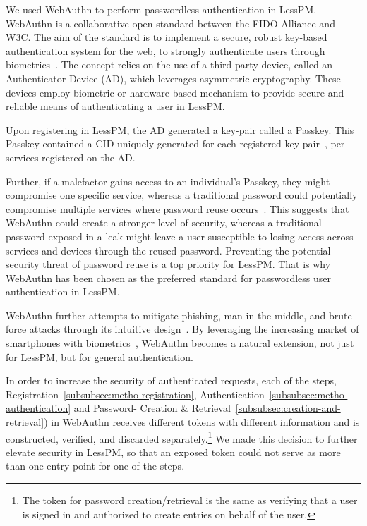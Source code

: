 We used WebAuthn to perform passwordless authentication in LessPM\@.
WebAuthn is a collaborative open standard between the FIDO Alliance and W3C\@.
The aim of the standard is to implement a secure, robust key-based
authentication system for the web, to strongly authenticate users through
biometrics~\cite{webauthn_level_2}.
The concept relies on the use of a third-party device, called an
Authenticator Device (AD), which leverages asymmetric cryptography.
These devices employ biometric or hardware-based mechanism to provide secure
and reliable means of authenticating a user in LessPM\@.

Upon registering in LessPM, the AD generated a key-pair called a Passkey.
This Passkey contained a CID uniquely generated for each registered
key-pair~\cite{webauthn_credential_id,webauthn_public_key_credential}, per
services registered on the AD\@.

Further, if a malefactor gains access to an individual's Passkey, they might
compromise one specific service, whereas a traditional password could
potentially compromise multiple services where password reuse
occurs~\cite{wang2018next}.
This suggests that WebAuthn could create a stronger level of security, whereas
a traditional password exposed in a leak might leave a user susceptible to
losing access across services and devices through the reused password.
Preventing the potential security threat of password reuse is a top priority
for LessPM\@.
That is why WebAuthn has been chosen as the preferred standard for
passwordless user authentication in LessPM\@.

WebAuthn further attempts to mitigate phishing, man-in-the-middle, and
brute-force attacks through its intuitive design~\cite{webauthn_level_2}.
By leveraging the increasing market of smartphones with
biometrics~\cite{statista-biometric-transactions}, WebAuthn becomes a natural
extension, not just for LessPM, but for general authentication.

In order to increase the security of authenticated requests, each of the
steps, Registration~\ref{subsubsec:metho-registration},
Authentication~\ref{subsubsec:metho-authentication} and
Password- Creation \& Retrieval~\ref{subsubsec:creation-and-retrieval})
in WebAuthn receives different tokens with different information and is
constructed, verified, and discarded separately.\footnote{
  The token for password creation/retrieval is the same as verifying that a user
  is signed in and authorized to create entries on behalf of the user.
}
We made this decision to further elevate security in LessPM, so that an
exposed token could not serve as more than one entry point for one of the steps.

